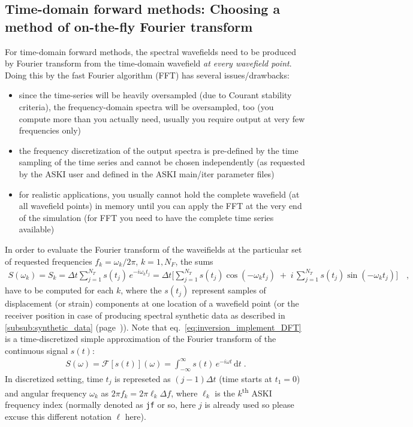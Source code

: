 \documentclass[12pt,a4paper]{article}
\newcommand{\lcode}[1]{\nolinkurl{#1}}
\newcommand{\ASKI}{ {\ttfamily ASKI} }
\newcommand{\myref}[1]{\ref{#1} (page~\pageref{#1})}
\begin{document}
\subsection{Time-domain forward methods: Choosing a method of on-the-fly Fourier transform} \label{ssec-extend:Goertzel}
For time-domain forward methods, the spectral wavefields need to be produced by Fourier transform from the 
time-domain wavefield \emph{at every wavefield point}. Doing this by the fast Fourier algorithm (FFT) has several
issues/drawbacks:
\begin{itemize}
\item since the time-series will be heavily oversampled (due to Courant stability criteria), the frequency-domain 
  spectra will be oversampled, too (you compute more than you actually need, usually you require output at very 
  few frequencies only)
\item the frequency discretization of the output spectra is pre-defined by the time sampling of the time series
  and cannot be chosen independently (as requested by the \ASKI{} user and defined in the \ASKI{} main/iter parameter 
  files)
\item for realistic applications, you usually cannot hold the complete wavefield (at all wavefield points) in 
  memory until you can apply the FFT at the very end of the simulation (for FFT you need to have the complete 
  time series available)
\end{itemize}
In order to evaluate the Fourier transform of the waveifields at the particular set of requested frequencies 
$f_k = \omega_k/2\pi$, $k = 1,N_F$, the sums
\begin{align}
S(\omega_k) = S_k = \Delta t \sum_{j=1}^{N_T} s(t_j) \, e^{-i\omega_k t_j} = \Delta t \Big[ \sum_{j=1}^{N_T} s(t_j)\cos(-\omega_k t_j)\;+\; i\, \sum_{j=1}^{N_T} s(t_j)\sin(-\omega_k t_j) \Big] \quad, \label{eq:inversion_implement_DFT}
\end{align}
have to be computed for each $k$, where the $s(t_j)$ represent samples of displacement (or strain) components at 
one location of a wavefield point (or the receiver position in case of producing spectral synthetic data as
described in \myref{subsub:synthetic_data}). Note that eq.~\eqref{eq:inversion_implement_DFT} is a time-discretized
simple approximation of the Fourier transform of the continuous signal $s(t)$:
\begin{align}
  S(\omega) = \mathcal{F}[s(t)](\omega) = \int_{-\infty}^{\infty} s(t) \, e^{-i\omega t}\, \mathrm{d}t \;.
\end{align}
In discretized setting, time $t_j$ is represeted as $(j-1)\Delta t$ (time starts at $t_1=0$) and angular frequency 
$\omega_k$ as $2\pi f_k = 2\pi \ell_k \Delta f$, where $\ell_k$ is the $k$\textsuperscript{th} \ASKI{} 
frequency index (normally denoted as \lcode{jf} or so, here $j$ is already used so please excuse this different
notation $\ell$ here).
\end{document}
